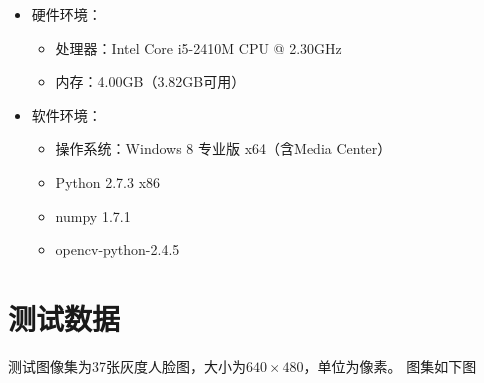 \begin{itemize}
\item 硬件环境：
\begin{itemize}
\item 处理器：Intel Core i5-2410M CPU @ 2.30GHz
\item 内存：4.00GB（3.82GB可用）
\end{itemize}
\item 软件环境：
\begin{itemize}
\item 操作系统：Windows 8 专业版 x64（含Media Center） 
\item Python 2.7.3 x86
\item numpy 1.7.1
\item opencv-python-2.4.5
\end{itemize}
\end{itemize}

\section{测试数据}
\label{sec:benchmark-data}

测试图像集为37张灰度人脸图，大小为$640 \times 480$，单位为像素。
图集如下图

\begin{figure}[H]
  \centering
  \vspace{0.1cm}

  \vspace{0.1cm}

  \vspace{0.1cm}

  \vspace{0.1cm}

  \vspace{0.1cm}
\end{figure}
\begin{figure}[H]
  \centering

  \vspace{0.1cm}

  \vspace{0.1cm}

  \vspace{0.1cm}

  \vspace{0.1cm}

\end{figure}


